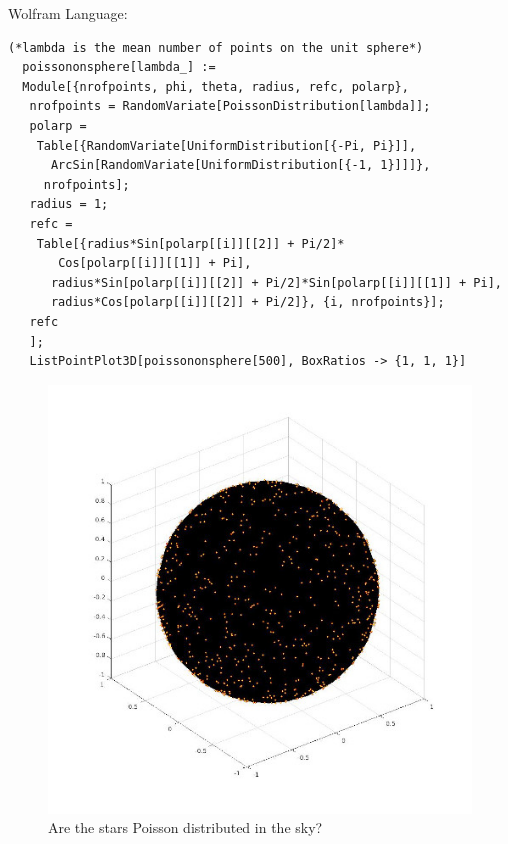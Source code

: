 \documentclass{article}
\begin{document}
Wolfram Language:
\begin{verbatim}
(*lambda is the mean number of points on the unit sphere*) 
  poissononsphere[lambda_] := 
  Module[{nrofpoints, phi, theta, radius, refc, polarp}, 
   nrofpoints = RandomVariate[PoissonDistribution[lambda]];
   polarp = 
    Table[{RandomVariate[UniformDistribution[{-Pi, Pi}]], 
      ArcSin[RandomVariate[UniformDistribution[{-1, 1}]]]}, 
     nrofpoints];
   radius = 1;
   refc = 
    Table[{radius*Sin[polarp[[i]][[2]] + Pi/2]*
       Cos[polarp[[i]][[1]] + Pi],
      radius*Sin[polarp[[i]][[2]] + Pi/2]*Sin[polarp[[i]][[1]] + Pi],
      radius*Cos[polarp[[i]][[2]] + Pi/2]}, {i, nrofpoints}];
   refc
   ];
   ListPointPlot3D[poissononsphere[500], BoxRatios -> {1, 1, 1}]  
\end{verbatim}

\begin{figure}
  \includegraphics[width=\linewidth]{poissononsphere.jpg}
  \caption{Are the stars Poisson distributed in the sky?}
\end{figure}
\end{document}
